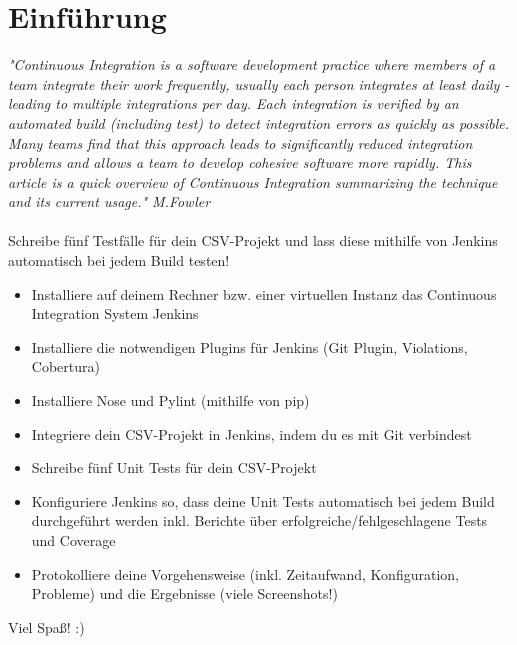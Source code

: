\documentclass[letterpaper, 12pt]{article}
\let\tempsection\section
\renewcommand\section[1]{\vspace{-0.3cm}\tempsection{#1}\vspace{-0.3cm}}
\begin{document}
\parindent 0pt
\parskip 6pt



\clearpage
\thispagestyle{empty}
\tableofcontents

\newpage
{}
\pagestyle{fancy}

\section{Einführung}
\textit{"Continuous Integration is a software development practice where members of a team integrate their work frequently, usually each person integrates at least daily - leading to multiple integrations per day. Each integration is verified by an automated build (including test) to detect integration errors as quickly as possible. Many teams find that this approach leads to significantly reduced integration problems and allows a team to develop cohesive software more rapidly. This article is a quick overview of Continuous Integration summarizing the technique and its current usage." M.Fowler} \\ \\

Schreibe fünf Testfälle für dein CSV-Projekt und lass diese mithilfe von Jenkins automatisch bei jedem Build testen!

\begin{itemize}
	\item Installiere auf deinem Rechner bzw. einer virtuellen Instanz das Continuous Integration System Jenkins
	\item Installiere die notwendigen Plugins für Jenkins (Git Plugin, Violations, Cobertura)
	\item Installiere Nose und Pylint (mithilfe von pip)
	\item Integriere dein CSV-Projekt in Jenkins, indem du es mit Git verbindest
	\item Schreibe fünf Unit Tests für dein CSV-Projekt
	\item Konfiguriere Jenkins so, dass deine Unit Tests automatisch bei jedem Build durchgeführt werden inkl. Berichte über erfolgreiche/fehlgeschlagene Tests und Coverage
	\item Protokolliere deine Vorgehensweise (inkl. Zeitaufwand, Konfiguration, Probleme) und die Ergebnisse (viele Screenshots!)
\end{itemize}

Viel Spaß! :)
\newpage
\end{document}
